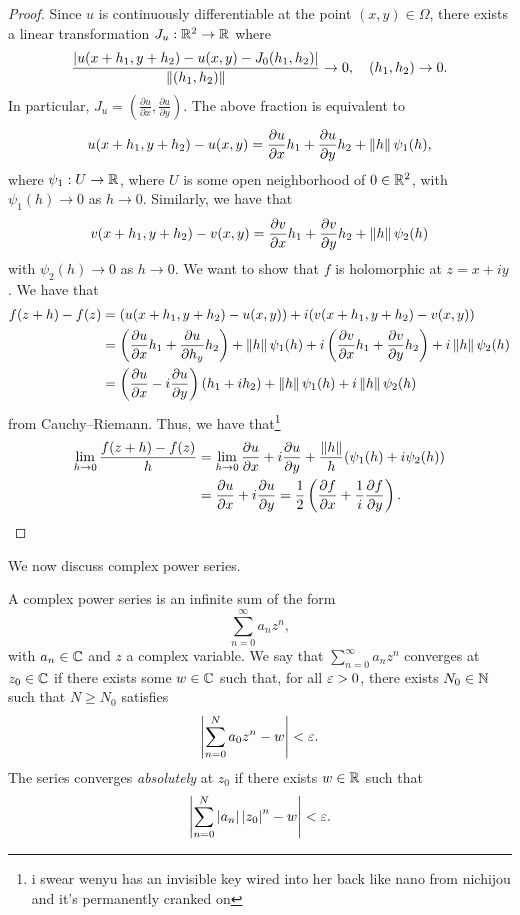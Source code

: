 \begin{proof}
    Since $u$ is continuously differentiable at the point $(x, y) \in \Omega$, there exists a linear transformation $J_u : \mathbb R^2 \to \mathbb R$ where
    \[ \frac{\left\lvert u(x+h_1, y+h_2) - u(x, y) - J_0(h_1, h_2) \right\rvert}{\left\lVert (h_1, h_2) \right\rVert}  \to 0, \quad (h_1, h_2) \to 0. \]
    In particular, $J_u = (\frac{\partial u}{\partial x}, \frac{\partial u}{\partial y})$. The above fraction is equivalent to
    \[ u(x + h_1, y + h_2) - u(x, y) = \frac{\partial u}{\partial x} h_1 + \frac{\partial u}{\partial y} h_2 + \left\lVert h \right\rVert \psi_1(h), \]
    where $\psi_1 : U \to \mathbb R$, where $U$ is some open neighborhood of $0 \in \mathbb R^2$, with $\psi_1(h) \to 0$ as $h \to 0$. Similarly, we have that
    \[ v(x + h_1, y + h_2) - v(x, y) = \frac{\partial v}{\partial x} h_1 + \frac{\partial v}{\partial y} h_2 + \left\lVert h \right\rVert \psi_2(h) \]
    with $\psi_2(h) \to 0$ as $h \to 0$. We want to show that $f$ is holomorphic at $z = x + iy$. We have that
    \begin{align*}
        f(z + h) - f(z) &= (u(x + h_1, y + h_2) - u(x, y)) + i(v(x + h_1, y + h_2) - v(x, y)) \\
        &= \left(\frac{\partial u}{\partial x} h_1 + \frac{\partial u}{\partial h_y} h_2\right) + \left\lVert h \right\rVert \psi_1(h) + i\left(\frac{\partial v}{\partial x} h_1 + \frac{\partial v}{\partial y} h_2\right) + i \left\lVert h \right\rVert \psi_2(h) \\
        &= \left(\frac{\partial u}{\partial x} - i \frac{\partial u}{\partial y}\right) (h_1 + ih_2) + \left\lVert h \right\rVert \psi_1(h) + i \left\lVert h \right\rVert \psi_2(h)
    \end{align*}
    from Cauchy--Riemann. Thus, we have that\footnote{i swear wenyu has an invisible key wired into her back like nano from nichijou and it's permanently cranked on}
    \begin{align*}
        \lim_{h \to 0} \frac{f(z+h) - f(z)}{h} &= \lim_{h \to 0} \frac{\partial u}{\partial x} + i \frac{\partial u}{\partial y} + \frac{\left\lVert h \right\rVert}{h} (\psi_1(h) + i \psi_2(h)) \\
        &= \frac{\partial u}{\partial x} + i \frac{\partial u}{\partial y} = \frac{1}{2} \left(\frac{\partial f}{\partial x} + \frac{1}{i} \frac{\partial f}{\partial y}\right). \qedhere
    \end{align*}
\end{proof}
\noindent We now discuss complex power series.
\begin{definition}
    A complex power series is an infinite sum of the form
    \[ \sum_{n=0}^\infty a_n z^n, \]
    with $a_n \in \mathbb C$ and $z$ a complex variable. We say that $\sum_{n=0}^\infty a_n z^n$ converges at $z_0 \in \mathbb C$ if there exists some $w \in \mathbb C$ such that, for all $\varepsilon > 0$, there exists $N_0 \in \mathbb N$ such that $N \geq N_0$ satisfies
    \[ \left\lvert \sum_{n=0}^N a_0 z^n - w \right\rvert < \varepsilon. \]
    The series converges \textit{absolutely} at $z_0$ if there exists $w \in \mathbb R$ such that
    \[ \left\lvert \sum_{n=0}^N \left\lvert a_n \right\rvert \left\lvert z_0 \right\rvert^n - w \right\rvert < \varepsilon. \]
\end{definition}
